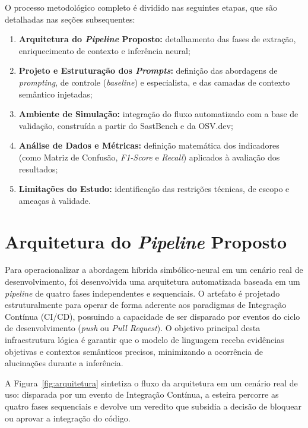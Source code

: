 O processo metodológico completo é dividido nas seguintes etapas, que são detalhadas nas seções subsequentes:

\begin{enumerate}
    \item \textbf{Arquitetura do \textit{Pipeline} Proposto:} detalhamento das fases de extração, enriquecimento de contexto e inferência neural;
    \item \textbf{Projeto e Estruturação dos \textit{Prompts}:} definição das abordagens de \textit{prompting}, de controle (\textit{baseline}) e especialista, e das camadas de contexto semântico injetadas;
    \item \textbf{Ambiente de Simulação:} integração do fluxo automatizado com a base de validação, construída a partir do SastBench e da OSV.dev;
    \item \textbf{Análise de Dados e Métricas:} definição matemática dos indicadores (como Matriz de Confusão, \textit{F1-Score} e \textit{Recall}) aplicados à avaliação dos resultados;
    \item \textbf{Limitações do Estudo:} identificação das restrições técnicas, de escopo e ameaças à validade.
\end{enumerate}

\section{Arquitetura do \textit{Pipeline} Proposto}
\label{sec:arquitetura}

Para operacionalizar a abordagem híbrida simbólico-neural em um cenário real de desenvolvimento, foi desenvolvida uma arquitetura automatizada baseada em um \textit{pipeline} de quatro fases independentes e sequenciais. O artefato é projetado estruturalmente para operar de forma aderente aos paradigmas de Integração Contínua (CI/CD), possuindo a capacidade de ser disparado por eventos do ciclo de desenvolvimento (\textit{push} ou \textit{Pull Request}). O objetivo principal desta infraestrutura lógica é garantir que o modelo de linguagem receba evidências objetivas e contextos semânticos precisos, minimizando a ocorrência de alucinações durante a inferência.

A Figura~\ref{fig:arquitetura} sintetiza o fluxo da arquitetura em um cenário real de uso:
disparada por um evento de Integração Contínua, a esteira percorre as quatro fases
sequenciais e devolve um veredito que subsidia a decisão de bloquear ou aprovar a
integração do código.

